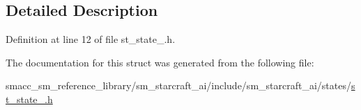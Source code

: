 \subsection{Detailed Description}


Definition at line 12 of file st\+\_\+state\+\_.\+h.



The documentation for this struct was generated from the following file\+:\begin{DoxyCompactItemize}
\item 
smacc\+\_\+sm\+\_\+reference\+\_\+library/sm\+\_\+starcraft\+\_\+ai/include/sm\+\_\+starcraft\+\_\+ai/states/\hyperlink{sm__starcraft__ai_2include_2sm__starcraft__ai_2states_2st__state__3_8h}{st\+\_\+state\+\_.\+h}\end{DoxyCompactItemize}

